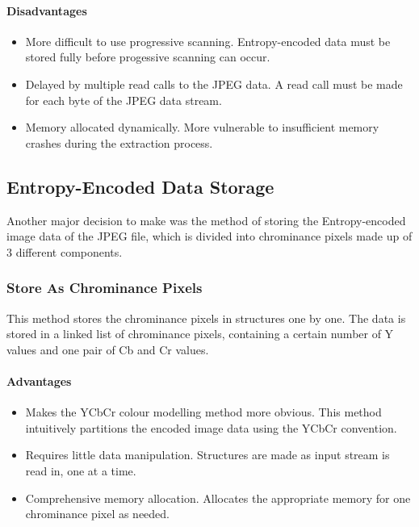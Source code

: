 \paragraph*{Disadvantages}
\begin{itemize}
	\item More difficult to use progressive scanning. Entropy-encoded data must be stored fully before progessive scanning can occur.
	\item Delayed by multiple read calls to the JPEG data. A read call must be made for each byte of the JPEG data stream.
	\item Memory allocated dynamically. More vulnerable to insufficient memory crashes during the extraction process.
\end{itemize}

\subsection{Entropy-Encoded Data Storage}

Another major decision to make was the method of storing the Entropy-encoded image data of the JPEG file, 
which is divided into chrominance pixels made up of 3 different components.

\subsubsection*{Store As Chrominance Pixels}

This method stores the chrominance pixels in structures one by one. 
The data is stored in a linked list of chrominance pixels, containing a certain number of Y values and one pair of Cb and Cr values.

\paragraph*{Advantages}
\begin{itemize}
	\item Makes the YCbCr colour modelling method more obvious. 
		This method intuitively partitions the encoded image data using the YCbCr convention.
	\item Requires little data manipulation. Structures are made as input stream is read in, one at a time.
	\item Comprehensive memory allocation. Allocates the appropriate memory for one chrominance pixel as needed.
\end{itemize}

